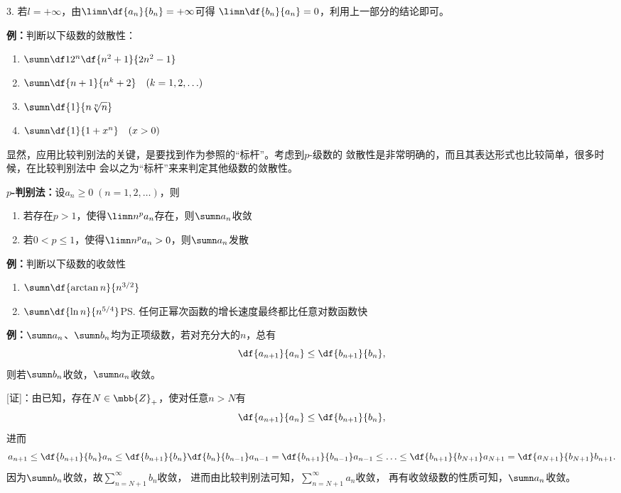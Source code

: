 3. 若$l=+\infty$，由$\limn\df{a_n}{b_n}=+\infty$可得
$\limn\df{b_n}{a_n}=0$，利用上一部分的结论即可。\fin

{\bf 例：}判断以下级数的敛散性：
\begin{enumerate}[(1)]
  \setlength{\itemindent}{1cm}
  \item $\sumn\df 1{2^n}\df{n^2+1}{2n^2-1}$ 
  \item $\sumn\df{n+1}{n^k+2}\quad (k=1,2,\ldots)$ 
  \item $\sumn\df{1}{n\sqrt[n]{n}}$ 
  \item $\sumn\df{1}{1+x^n}\quad(x>0)$
\end{enumerate}

显然，应用比较判别法的关键，是要找到作为参照的“标杆”。考虑到$p$-级数的
敛散性是非常明确的，而且其表达形式也比较简单，很多时候，在比较判别法中
会以之为“标杆”来来判定其他级数的敛散性。

\begin{thx}
	{\bf $p$-判别法：}设$a_n\geq 0\;(n=1,2,\ldots)$，则 
	\begin{enumerate}
	  \item 若存在$p>1$，使得$\limn n^pa_n$存在，则$\sumn a_n$收敛 
	  \item 若$0<p\leq 1$，使得$\limn n^pa_n>0$，则$\sumn a_n$发散
	\end{enumerate}
\end{thx}

{\bf 例：}判断以下级数的收敛性
\begin{enumerate}[(1)]
  \setlength{\itemindent}{1cm}
  \item $\sumn\df{\arctan n}{n^{3/2}}$
  \item $\sumn\df{\ln n}{n^{5/4}}$\ps{任何正幂次函数的增长速度最终都比任意对数函数快}
\end{enumerate}

{\bf 例：}$\sumn a_n$、$\sumn b_n$均为正项级数，若对充分大的$n$，总有
$$\df{a_{n+1}}{a_n}\leq\df{b_{n+1}}{b_n},$$
则若$\sumn b_n$收敛，$\sumn a_n$收敛。

[证]：由已知，存在$N\in\mbb{Z}_+$，使对任意$n>N$有
$$\df{a_{n+1}}{a_n}\leq\df{b_{n+1}}{b_n},$$
进而
$$a_{n+1}
\leq\df{b_{n+1}}{b_n}a_n
\leq\df{b_{n+1}}{b_n}\df{b_{n}}{b_{n-1}}a_{n-1}
=\df{b_{n+1}}{b_{n-1}}a_{n-1}
\leq\ldots
\leq\df{b_{n+1}}{b_{N+1}}a_{N+1}
=\df{a_{N+1}}{b_{N+1}}b_{n+1}.$$
因为$\sumn b_n$收敛，故$\sum\limits_{n=N+1}^{\infty}b_n$收敛，
进而由比较判别法可知，$\sum\limits_{n=N+1}^{\infty}a_n$收敛，
再有收敛级数的性质可知，$\sumn a_n$收敛。\fin

